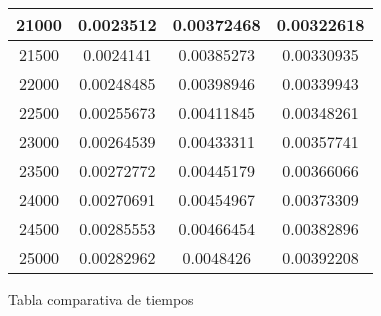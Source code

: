 \documentclass{article}
\begin{document}
\begin{longtable}{|c|c|c|c|}
			21000	 &  0.0023512	 &  0.00372468	 &  0.00322618  \\ \hline
			21500	 &  0.0024141	 &  0.00385273	 &  0.00330935  \\ \hline
			22000	 &  0.00248485	 &  0.00398946	 &  0.00339943  \\ \hline
			22500	 &  0.00255673	 &  0.00411845	 &  0.00348261  \\ \hline
			23000	 &  0.00264539	 &  0.00433311	 &  0.00357741  \\ \hline
			23500	 &  0.00272772	 &  0.00445179	 &  0.00366066  \\ \hline
			24000	 &  0.00270691	 &  0.00454967	 &  0.00373309  \\ \hline
			24500	 &  0.00285553	 &  0.00466454	 &  0.00382896  \\ \hline
			25000	 &  0.00282962	 &  0.0048426	 &  0.00392208  \\ \hline
		\end{longtable}
		\begin{center}
		\tiny Tabla comparativa de tiempos
		\end{center}
\end{document}
